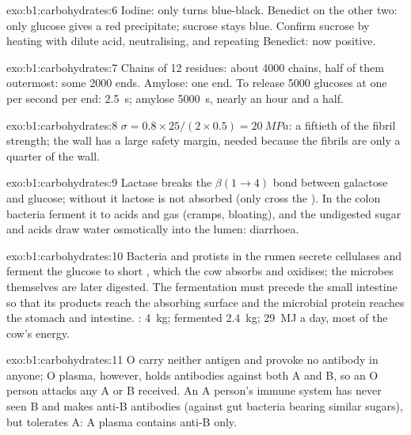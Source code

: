 \begin{solution}{exo:b1:carbohydrates:6}
Iodine: only  turns blue-black. Benedict on the other two: only
glucose gives a red precipitate; sucrose stays blue. Confirm sucrose by
heating with dilute acid, neutralising, and repeating Benedict: now
positive.
\end{solution}

\begin{solution}{exo:b1:carbohydrates:7}
Chains of 12 residues: about \num{4000} chains, half of them outermost:
some \num{2000} ends. Amylose: one end. To release \num{5000} glucoses
at one per second per end:  \qty{2.5}{s}; amylose \qty{5000}{s},
nearly an hour and a half.
\end{solution}

\begin{solution}{exo:b1:carbohydrates:8}
$\sigma = 0.8\times 25/(2\times 0.5) = \qty{20}{MPa}$: a fiftieth of the
fibril strength; the wall has a large safety margin, needed because the
fibrils are only a quarter of the wall.
\end{solution}

\begin{solution}{exo:b1:carbohydrates:9}
Lactase breaks the $\beta(1{\to}4)$ bond between galactose and glucose;
without it lactose is not absorbed (only  cross the
). In the colon bacteria ferment it to acids and gas
(cramps, bloating), and the undigested sugar and acids draw water
osmotically into the lumen: diarrhoea.
\end{solution}

\begin{solution}{exo:b1:carbohydrates:10}
Bacteria and protists in the rumen secrete cellulases and ferment the
glucose to short , which the cow absorbs and oxidises; the
microbes themselves are later digested. The fermentation must precede
the small intestine so that its products reach the absorbing surface
and the microbial protein reaches the stomach and intestine. :
\qty{4}{kg}; fermented \qty{2.4}{kg}; \qty{29}{MJ} a day, most of the
cow's energy.
\end{solution}

\begin{solution}{exo:b1:carbohydrates:11}
O  carry neither antigen and provoke no antibody in anyone; O
plasma, however, holds antibodies against both A and B, so an O person
attacks any A or B  received. An A person's immune system has never
seen B and makes anti-B antibodies (against gut bacteria bearing
similar sugars), but tolerates A: A plasma contains anti-B only.
\end{solution}

